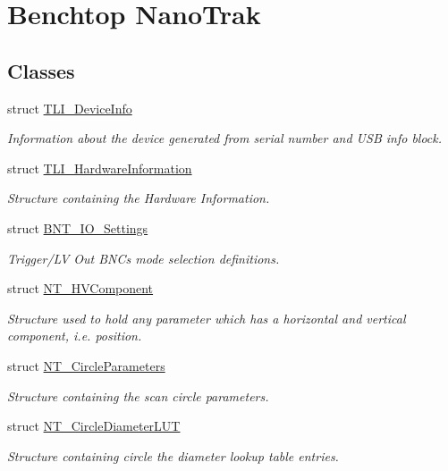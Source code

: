 \hypertarget{group___benchtop_nano_trak}{}\section{Benchtop Nano\+Trak}
\label{group___benchtop_nano_trak}
\subsection*{Classes}
\begin{DoxyCompactItemize}
\item 
struct \hyperlink{struct_t_l_i___device_info}{T\+L\+I\+\_\+\+Device\+Info}
\begin{DoxyCompactList}\small\item\em Information about the device generated from serial number and U\+SB info block. \end{DoxyCompactList}\item 
struct \hyperlink{struct_t_l_i___hardware_information}{T\+L\+I\+\_\+\+Hardware\+Information}
\begin{DoxyCompactList}\small\item\em Structure containing the Hardware Information. \end{DoxyCompactList}\item 
struct \hyperlink{struct_b_n_t___i_o___settings}{B\+N\+T\+\_\+\+I\+O\+\_\+\+Settings}
\begin{DoxyCompactList}\small\item\em Trigger/\+LV Out B\+N\+Cs mode selection definitions. \end{DoxyCompactList}\item 
struct \hyperlink{struct_n_t___h_v_component}{N\+T\+\_\+\+H\+V\+Component}
\begin{DoxyCompactList}\small\item\em Structure used to hold any parameter which has a horizontal and vertical component, i.\+e. position. \end{DoxyCompactList}\item 
struct \hyperlink{struct_n_t___circle_parameters}{N\+T\+\_\+\+Circle\+Parameters}
\begin{DoxyCompactList}\small\item\em Structure containing the scan circle parameters. \end{DoxyCompactList}\item 
struct \hyperlink{struct_n_t___circle_diameter_l_u_t}{N\+T\+\_\+\+Circle\+Diameter\+L\+UT}
\begin{DoxyCompactList}\small\item\em Structure containing circle the diameter lookup table entries. \end{DoxyCompactList}\item 

\end{DoxyCompactItemize}
